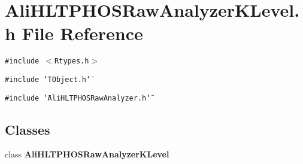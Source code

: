 \section{Ali\-HLTPHOSRaw\-Analyzer\-KLevel.h File Reference}
\label{AliHLTPHOSRawAnalyzerKLevel_8h}
{\tt \#include $<$Rtypes.h$>$}\par
{\tt \#include \char`\"{}TObject.h\char`\"{}}\par
{\tt \#include \char`\"{}Ali\-HLTPHOSRaw\-Analyzer.h\char`\"{}}\par
\subsection*{Classes}
\begin{CompactItemize}
\item 
class {\bf Ali\-HLTPHOSRaw\-Analyzer\-KLevel}
\end{CompactItemize}

